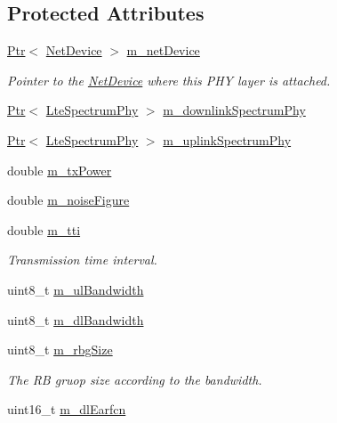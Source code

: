 \subsection*{Protected Attributes}
\begin{DoxyCompactItemize}
\item 
\hyperlink{classns3_1_1Ptr}{Ptr}$<$ \hyperlink{classns3_1_1NetDevice}{Net\+Device} $>$ \hyperlink{classns3_1_1LtePhy_aa26374d08b66fd1d4f5f1f216475052e}{m\+\_\+net\+Device}
\begin{DoxyCompactList}\small\item\em Pointer to the \hyperlink{classns3_1_1NetDevice}{Net\+Device} where this P\+HY layer is attached. \end{DoxyCompactList}\item 
\hyperlink{classns3_1_1Ptr}{Ptr}$<$ \hyperlink{classns3_1_1LteSpectrumPhy}{Lte\+Spectrum\+Phy} $>$ \hyperlink{classns3_1_1LtePhy_a9d9d4f9b07919b941583dca6f4789762}{m\+\_\+downlink\+Spectrum\+Phy}
\item 
\hyperlink{classns3_1_1Ptr}{Ptr}$<$ \hyperlink{classns3_1_1LteSpectrumPhy}{Lte\+Spectrum\+Phy} $>$ \hyperlink{classns3_1_1LtePhy_addc3110b5a1f7b63c52f4ce8ca59c6cd}{m\+\_\+uplink\+Spectrum\+Phy}
\item 
double \hyperlink{classns3_1_1LtePhy_a09eff916f067eab2f7bf4f7b5f7f2750}{m\+\_\+tx\+Power}
\item 
double \hyperlink{classns3_1_1LtePhy_a89b2ff50bd38b68e02924bb9d6d193e2}{m\+\_\+noise\+Figure}
\item 
double \hyperlink{classns3_1_1LtePhy_ad20890127f2da3c4fd4c99507177b55c}{m\+\_\+tti}
\begin{DoxyCompactList}\small\item\em Transmission time interval. \end{DoxyCompactList}\item 
uint8\+\_\+t \hyperlink{classns3_1_1LtePhy_ac3eb3231fa82f4f60047b4752507a144}{m\+\_\+ul\+Bandwidth}
\item 
uint8\+\_\+t \hyperlink{classns3_1_1LtePhy_a566aee423c957f3b7ab7f8f7eacc7eb3}{m\+\_\+dl\+Bandwidth}
\item 
uint8\+\_\+t \hyperlink{classns3_1_1LtePhy_af18a95f518b590c96f32ef18fefed7f7}{m\+\_\+rbg\+Size}
\begin{DoxyCompactList}\small\item\em The RB gruop size according to the bandwidth. \end{DoxyCompactList}\item 
uint16\+\_\+t \hyperlink{classns3_1_1LtePhy_ac8fee98bfc4a1b1b5f3bbb6d721b3474}{m\+\_\+dl\+Earfcn}

\end{DoxyCompactItemize}
